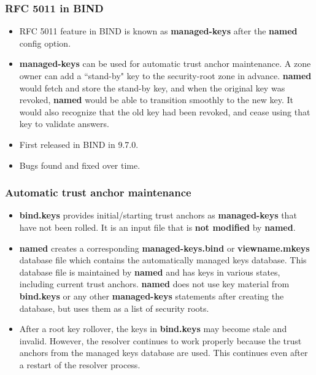 \documentclass{beamer}
\begin{document}
\frame
{
  \frametitle{RFC 5011 in BIND}

  \begin{itemize}
  \item RFC 5011 feature in BIND is known as \textbf{managed-keys} after
    the \textbf{named} config option.
  \item \textbf{managed-keys} can be used for automatic trust anchor
    maintenance. A zone owner can add a ``stand-by" key to the
    security-root zone in advance. \textbf{named} would fetch and store
    the stand-by key, and when the original key was revoked,
    \textbf{named} would be able to transition smoothly to the new
    key. It would also recognize that the old key had been revoked, and
    cease using that key to validate answers.
  \item First released in BIND in 9.7.0.
  \item Bugs found and fixed over time.
  \end{itemize}
}

\frame
{
  \frametitle{Automatic trust anchor maintenance}

  \begin{itemize}

  \item \textbf{bind.keys} provides initial/starting trust anchors as
    \textbf{managed-keys} that have not been rolled. It is an input file that is
    \textbf{not modified} by \textbf{named}.

  \item \textbf{named} creates a corresponding
    \textbf{managed-keys.bind} or \textbf{viewname.mkeys} database file
    which contains the automatically managed keys database. This
    database file is maintained by \textbf{named} and has keys in
    various states, including current trust anchors. \textbf{named} does
    not use key material from \textbf{bind.keys} or any other
    \textbf{managed-keys} statements after creating the database, but
    uses them as a list of security roots.

  \item After a root key rollover, the keys in \textbf{bind.keys} may
    become stale and invalid. However, the resolver continues to work
    properly because the trust anchors from the managed keys database
    are used. This continues even after a restart of the resolver
    process.

  \end{itemize}
}
\end{document}
